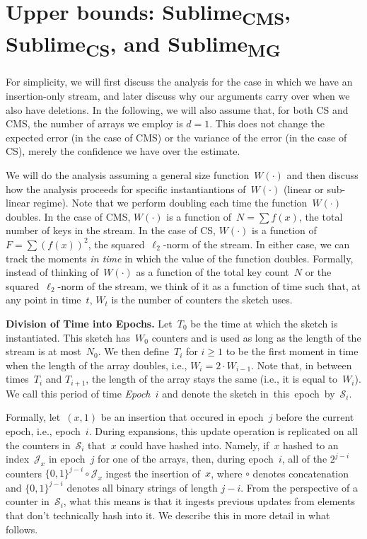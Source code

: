 \documentclass[sigconf]{acmart}
\newcommand{\sketch}{Sublime}
\newcommand{\sketchcms}{\sketch\textsubscript{CMS}\xspace}
\newcommand{\sketchcs}{\sketch\textsubscript{CS}\xspace}
\newcommand{\sketchmg}{\sketch\textsubscript{MG}\xspace}
\begin{document}
\section{Upper bounds: \sketchcms, \sketchcs, and \sketchmg}\label{sec:ommitted_proofs_upper}
For simplicity, we will first discuss the analysis for the case in which we
have an insertion-only stream, and later discuss why our arguments carry over
when we also have deletions. In the following, we will also assume that, for
both CS and CMS, the number of arrays we employ is $d=1$. This does not change
the expected error (in the case of CMS) or the variance of the error (in the
case of CS), merely the confidence we have over the estimate.

We will do the analysis assuming a general size function~$W(\cdot)$ and then
discuss how the analysis proceeds for specific instantiantions of~$W(\cdot)$
(linear or sub-linear regime). Note that we perform doubling each time the
function~$W(\cdot)$ doubles. In the case of CMS, $W(\cdot)$ is a function of~$N
= \sum f(x)$, the total number of keys in the stream. In the case of CS,
$W(\cdot)$ is a function of~$F = \sum (f(x))^2$, the
squared~$\ell_2${\nobreakdash-}norm of the stream. In either case, we can track
the moments \emph{in time} in which the value of the function doubles.
Formally, instead of thinking of~$W(\cdot)$ as a function of the total key
count~$N$ or the squared~$\ell_2${\nobreakdash-}norm of the stream, we think of
it as a function of time such that, at any point in time~$t$, $W_t$ is the
number of counters the sketch uses.

\medskip
\textbf{Division of Time into Epochs.}
Let~$T_0$ be the time at which the sketch is instantiated. This sketch
has~$W_0$ counters and is used as long as the length of the stream is at
most~$N_0$. We then define~$T_i$ for $i\geq 1$ to be the first moment in time
when the length of the array doubles, i.e., $W_i = 2\cdot W_{i-1}$. Note that,
in between times~$T_{i}$ and $T_{i+1}$, the length of the array stays the same
(i.e., it is equal to~$W_i$). We call this period of time \emph{Epoch~$i$} and
denote the sketch in~this~epoch~by~$\mathcal{S}_{i}$.

Formally, let~$(x,1)$ be an insertion that occured in epoch~$j$ before the
current epoch, i.e., epoch~$i$. During expansions, this update operation is
replicated on all the counters in~$\mathcal{S}_i$ that~$x$ could have hashed
into. Namely, if~$x$ hashed to an index~$\mathcal{J}_x$ in epoch~$j$ for one of
the arrays, then, during epoch~$i$, all of the $2^{j-i}$ counters
$\{0,1\}^{j-i} \circ \mathcal{J}_x$ ingest the insertion of~$x$, where $\circ$
denotes concatenation and $\{0,1\}^{j-i}$ denotes all binary strings of length
$j-i$. From the perspective of a counter in~$\mathcal{S}_i$, what this means is
that it ingests previous updates from elements that don't technically hash into
it. We describe this in more detail in what follows.
\end{document}
